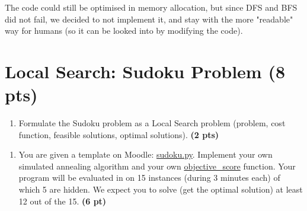 \documentclass[11pt,a4paper]{report}
\begin{document}
\begin{answer}
The code could still be optimised in memory allocation, but since DFS and BFS did not fail, we decided to not implement it, and stay with the more "readable" way for humans (so it can be looked into by modifying the code).
\end{answer}

\section{Local Search: Sudoku Problem (8 pts)}

\begin{enumerate}
    \item Formulate the Sudoku problem as a Local Search problem (problem, cost function, feasible solutions, optimal solutions). \textbf{(2 pts)}
\end{enumerate}

\begin{answer}

\end{answer}

\begin{enumerate}
    \item You are given a template on Moodle: \url{sudoku.py}. Implement your own simulated annealing algorithm and your own \url{objective\_score} function. Your program will be evaluated in on 15 instances (during 3 minutes each) of which 5 are hidden. We expect you to solve (get the optimal solution) at least 12 out of the 15. \textbf{(6 pt)}
\end{enumerate}

\begin{answer}
\end{answer}
\end{document}
